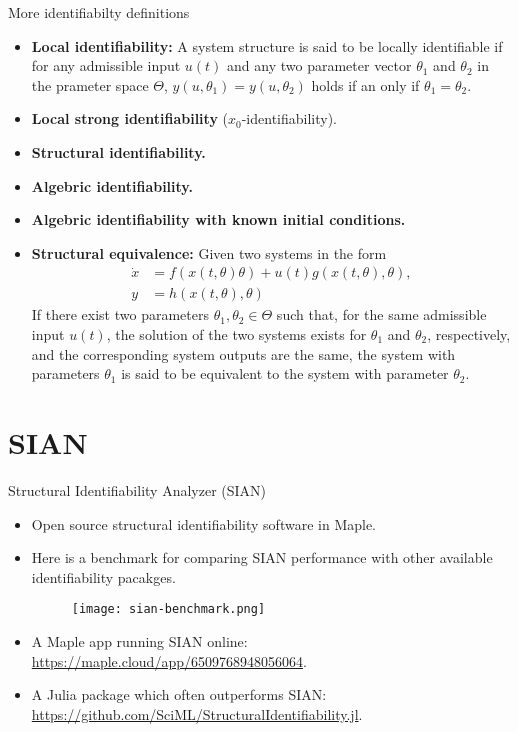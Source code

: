 \documentclass[10pt]{beamer}
\begin{document}
\begin{frame}{More identifiabilty definitions}
	\begin{itemize}
		\item \textbf{Local identifiability: } A system structure is said to be locally identifiable if for any admissible input $u(t)$ and any two parameter vector $\theta_1$ and $\theta_2$ in the prameter space $\Theta$, $y(u,\theta_1) = y(u,\theta_2)$ holds if an only if $\theta_1=\theta_2$.
		\item \textbf{Local strong identifiability } ($x_0$-identifiability). 
		\item \textbf{Structural identifiability.} 
		\item \textbf{Algebric identifiability.} 
		\item \textbf{Algebric identifiability with known initial conditions.} 
		\item \textbf{Structural equivalence: } Given two systems in the form
		\begin{subequations}
			\begin{align}
				\dot x &= f(x(t,\theta)\theta) + u(t) g(x(t,\theta), \theta),\\
				y &= h(x(t,\theta),\theta)
			\end{align}
		\end{subequations}
		If there exist two parameters $\theta_1,\theta_2 \in \Theta$ such that, for the same admissible input $u(t)$, the solution of the two systems exists for $\theta_1$ and $\theta_2$, respectively, and the corresponding system outputs are the same, the system with parameters $\theta_1$ is said to be equivalent to the system with parameter $\theta_2$.
	\end{itemize}
	
\end{frame}


\section{SIAN}

\begin{frame}{Structural Identifiability Analyzer (SIAN)}
	\begin{itemize}
		\item Open source structural identifiability software in Maple.
		\item Here is a benchmark for comparing SIAN performance with other available identifiability pacakges.
			\begin{figure}
				\texttt{[image: sian-benchmark.png]}
			\end{figure}
		\item A Maple app running SIAN online: \url{https://maple.cloud/app/6509768948056064}.
		\item A Julia package which often outperforms SIAN: \url{https://github.com/SciML/StructuralIdentifiability.jl}.
	\end{itemize}
\end{frame}
\end{document}

